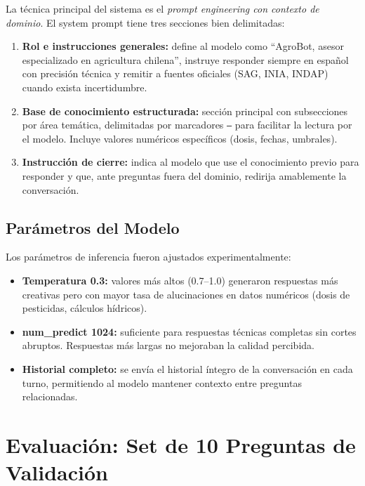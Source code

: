 \documentclass{IEEEtran}
\begin{document}
La técnica principal del sistema es el \emph{prompt engineering con contexto
de dominio}. El system prompt tiene tres secciones bien delimitadas:

\begin{enumerate}
  \item \textbf{Rol e instrucciones generales:} define al modelo como
    ``AgroBot, asesor especializado en agricultura chilena'', instruye
    responder siempre en español con precisión técnica y remitir a fuentes
    oficiales (SAG, INIA, INDAP) cuando exista incertidumbre.
  \item \textbf{Base de conocimiento estructurada:} sección principal
    con subsecciones por área temática, delimitadas por marcadores
    \texttt{---} para facilitar la lectura por el modelo.
    Incluye valores numéricos específicos (dosis, fechas, umbrales).
  \item \textbf{Instrucción de cierre:} indica al modelo que use el
    conocimiento previo para responder y que, ante preguntas fuera del
    dominio, redirija amablemente la conversación.
\end{enumerate}

\subsection{Parámetros del Modelo}

Los parámetros de inferencia fueron ajustados experimentalmente:

\begin{itemize}
  \item \textbf{Temperatura 0.3:} valores más altos (0.7--1.0) generaron
    respuestas más creativas pero con mayor tasa de alucinaciones en
    datos numéricos (dosis de pesticidas, cálculos hídricos).
  \item \textbf{num\_predict 1024:} suficiente para respuestas técnicas
    completas sin cortes abruptos. Respuestas más largas no mejoraban
    la calidad percibida.
  \item \textbf{Historial completo:} se envía el historial íntegro de
    la conversación en cada turno, permitiendo al modelo mantener contexto
    entre preguntas relacionadas.
\end{itemize}

\section{Evaluación: Set de 10 Preguntas de Validación}
\end{document}
